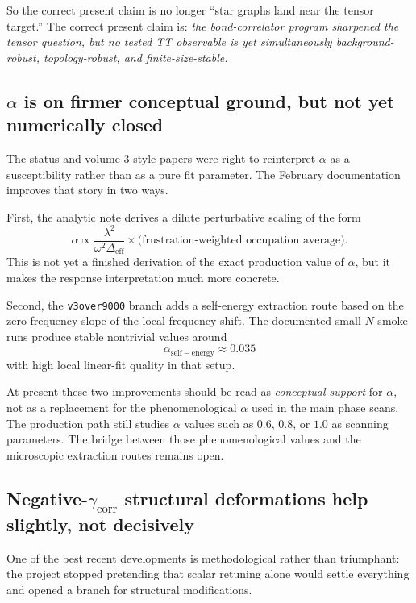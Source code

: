 \documentclass[11pt]{article}
\begin{document}
So the correct present claim is no longer ``star graphs land near the tensor target.'' The correct present claim is: \emph{the bond-correlator program sharpened the tensor question, but no tested TT observable is yet simultaneously background-robust, topology-robust, and finite-size-stable.}

\subsection{\texorpdfstring{$\alpha$}{alpha} is on firmer conceptual ground, but not yet numerically closed}

The status and volume-3 style papers were right to reinterpret $\alpha$ as a susceptibility rather than as a pure fit parameter. The February documentation improves that story in two ways.

First, the analytic note derives a dilute perturbative scaling of the form
\[
\alpha \propto \frac{\lambda^2}{\omega^2 \Delta_{\mathrm{eff}}}
\times
\text{(frustration-weighted occupation average)}.
\]
This is not yet a finished derivation of the exact production value of $\alpha$, but it makes the response interpretation much more concrete.

Second, the \texttt{v3over9000} branch adds a self-energy extraction route based on the zero-frequency slope of the local frequency shift. The documented small-$N$ smoke runs produce stable nontrivial values around
\[
\alpha_{\mathrm{self-energy}} \approx 0.035
\]
with high local linear-fit quality in that setup.

At present these two improvements should be read as \emph{conceptual support} for $\alpha$, not as a replacement for the phenomenological $\alpha$ used in the main phase scans. The production path still studies $\alpha$ values such as $0.6$, $0.8$, or $1.0$ as scanning parameters. The bridge between those phenomenological values and the microscopic extraction routes remains open.

\subsection{\texorpdfstring{Negative-$\gamma_{\mathrm{corr}}$}{Negative-gamma-corr} structural deformations help slightly, not decisively}

One of the best recent developments is methodological rather than triumphant: the project stopped pretending that scalar retuning alone would settle everything and opened a branch for structural modifications.
\end{document}

